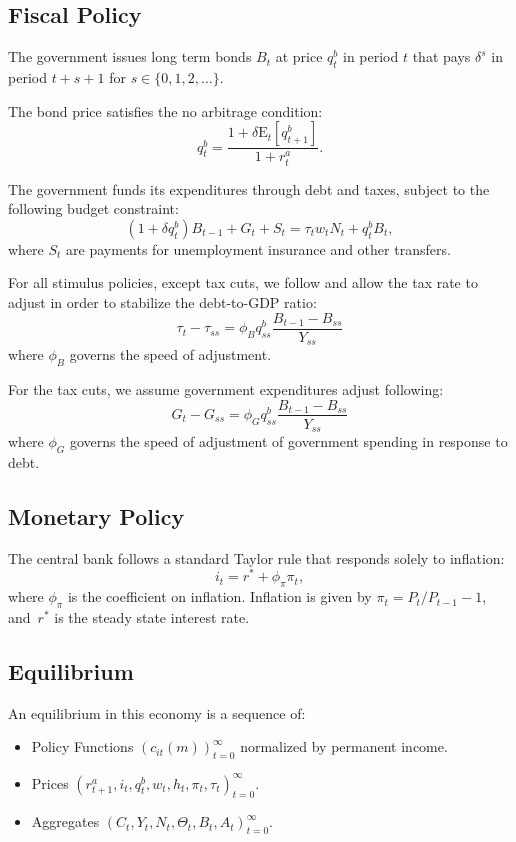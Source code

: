 \documentclass[\econtexRoot/HAFiscal]{subfiles}
\begin{document}
\subsection{Fiscal Policy}

The government issues long term bonds $B_{t}$ at price $q^{b}_{t}$ in period $t$ that pays $\delta^{s}$ in period $t+s+1$ for $s \in \{0,1,2,\ldots\}$.

The bond price satisfies the no arbitrage condition:
$$q^{b}_{t} = \frac{ 1  + \delta \mathrm{E}_{t}[q^{b}_{t+1}]}{1+r^{a}_{t}}.$$ 

The government funds its expenditures through debt and taxes, subject to the following budget constraint:
$$ (1 + \delta q^{b}_{t})B_{t-1} + G_{t}  + S_{t} = \tau_{t} w_{t} N_{t}+ q^{b}_{t}B_{t},$$
where $S_{t}$ are payments for unemployment insurance and other transfers.

For all stimulus policies, except tax cuts, we follow \cite{Auclert2020} and allow the tax rate to adjust in order to stabilize the debt-to-GDP ratio:
$$\tau_{t} - \tau_{ss} = \phi_{B} q^{b}_{ss} \frac{B_{t-1} - B_{ss} }{Y_{ss}}$$
where $\phi_{B}$ governs the speed of adjustment. 

For the tax cuts, we assume government expenditures adjust following:
$$G_{t} - G_{ss} = \phi_{G} q^{b}_{ss} \frac{B_{t-1} - B_{ss} }{Y_{ss}}$$
where $\phi_{G}$ governs the speed of adjustment of government spending in response to debt. 

\subsection{Monetary Policy}

The central bank follows a standard Taylor rule that responds solely to inflation:
$$i_{t} = r^{*} +\phi_{\pi} \pi_{t},$$ 
where $\phi_{\pi}$ is the coefficient on inflation. Inflation is given by $\pi_t = P_t/P_{t-1}-1$, and~$r^{*}$ is the steady state interest rate. 

\subsection{Equilibrium}

An equilibrium in this economy is a sequence of: 
\begin{itemize}[label=--]
	\item Policy Functions $\left( c_{it}(m) \right )_{t=0}^{\infty}$ normalized by permanent income.
	\item Prices $ \left( r^{a}_{t+1}, i_{t}, q^{b}_{t},  w_{t}, h_{t} , \pi_{t} , \tau_{t} \right) _{t=0}^{\infty}$.
	\item Aggregates $ \left(C_{t}, Y_{t} , N_{t},   \Theta_{t},  B_{t} , A_{t}  \right)_{t=0}^{\infty}$.
\end{itemize}
\end{document}
